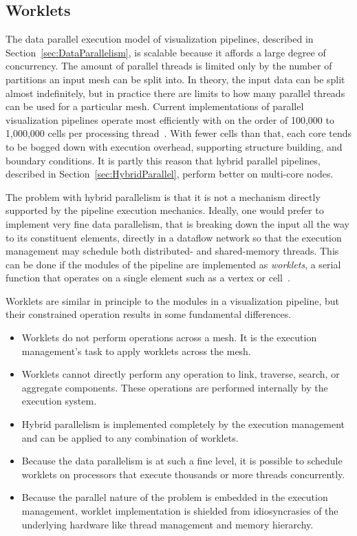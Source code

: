 \documentclass[journal,onecolumn,12pt,letterpaper,twoside]{IEEEtran}
\newcommand*{\lcite}[1]{~\cite{#1}}
\newcommand*{\keyterm}[1]{\emph{#1}}
\newenvironment{packeditemize}{
  \begin{itemize}
    \setlength{\topsep}{0pt}
    \setlength{\itemsep}{0pt}
    \setlength{\parskip}{0pt}
    \setlength{\parsep}{0pt}
    \setlength{\partopsep}{0pt}
}{
  \end{itemize}
}
\begin{document}
\subsection{Worklets}
\label{sec:Worklets}

The data parallel execution model of visualization pipelines, described in
Section~\ref{sec:DataParallelism}, is scalable because it affords a large
degree of concurrency.  The amount of parallel threads is limited only by
the number of partitions an input mesh can be split into.  In theory, the
input data can be split almost indefinitely, but in practice there are
limits to how many parallel threads can be used for a particular mesh.
Current implementations of parallel visualization pipelines operate most
efficiently with on the order of 100,000 to 1,000,000 cells per processing
thread\lcite{ParaViewTutorial}.  With fewer cells than that, each core
tends to be bogged down with execution overhead, supporting structure
building, and boundary conditions.  It is partly this reason that hybrid
parallel pipelines, described in Section~\ref{sec:HybridParallel}, perform
better on multi-core nodes.

The problem with hybrid parallelism is that it is not a mechanism directly
supported by the pipeline execution mechanics.  Ideally, one would prefer
to implement very fine data parallelism, that is breaking down the input
all the way to its constituent elements, directly in a dataflow network so
that the execution management may schedule both distributed- and
shared-memory threads.  This can be done if the modules of the pipeline are
implemented as \keyterm{worklets}, a serial function that operates on a
single element such as a vertex or cell\lcite{Moreland2011:SciDAC}.

Worklets are similar in principle to the modules in a visualization
pipeline, but their constrained operation results in some fundamental
differences.
\begin{packeditemize}
\item Worklets do not perform operations across a mesh.  It is the
  execution management's task to apply worklets across the mesh.
\item Worklets cannot directly perform any operation to link, traverse,
  search, or aggregate components.  These operations are performed
  internally by the execution system.
\item Hybrid parallelism is implemented completely by the execution
  management and can be applied to any combination of worklets.
\item Because the data parallelism is at such a fine level, it is possible
  to schedule worklets on processors that execute thousands or more threads
  concurrently.
\item Because the parallel nature of the problem is embedded in the
  execution management, worklet implementation is shielded from
  idiosyncrasies of the underlying hardware like thread management and
  memory hierarchy.
\end{packeditemize}
\end{document}
